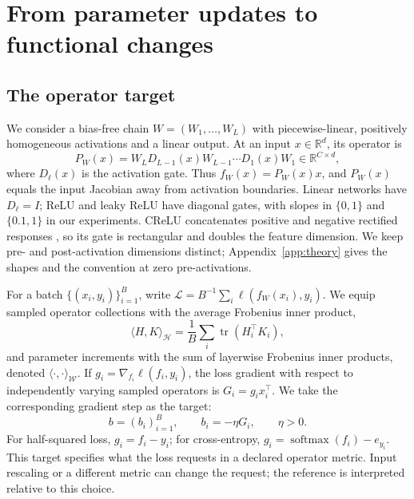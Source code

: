\documentclass{article}
\newcommand{\R}{\mathbb{R}}
\DeclareMathOperator{\tr}{tr}
\theoremstyle{definition}
\theoremstyle{remark}
\begin{document}
\section{From parameter updates to functional changes}
\label{sec:method}

\subsection{The operator target}

We consider a bias-free chain $W=(W_1,\ldots,W_L)$ with piecewise-linear, positively homogeneous activations and a linear output. At an input $x\in\R^d$, its operator is
\begin{equation}
 P_W(x)=W_LD_{L-1}(x)W_{L-1}\cdots D_1(x)W_1\in\R^{C\times d},
 \label{eq:operator}
\end{equation}
where $D_\ell(x)$ is the activation gate. Thus $f_W(x)=P_W(x)x$, and $P_W(x)$ equals the input Jacobian away from activation boundaries. Linear networks have $D_\ell=I$; ReLU and leaky ReLU have diagonal gates, with slopes in $\{0,1\}$ and $\{0.1,1\}$ in our experiments. CReLU concatenates positive and negative rectified responses \citep{shang2016crelu}, so its gate is rectangular and doubles the feature dimension. We keep pre- and post-activation dimensions distinct; Appendix~\ref{app:theory} gives the shapes and the convention at zero pre-activations.

For a batch $\{(x_i,y_i)\}_{i=1}^B$, write $\mathcal L=B^{-1}\sum_i\ell(f_W(x_i),y_i)$. We equip sampled operator collections with the average Frobenius inner product,
\begin{equation}
 \langle H,K\rangle_{\mathcal H}=\frac1B\sum_i\tr(H_i^\top K_i),
 \label{eq:metric}
\end{equation}
and parameter increments with the sum of layerwise Frobenius inner products, denoted $\langle\cdot,\cdot\rangle_{\mathcal W}$. If $g_i=\nabla_{f_i}\ell(f_i,y_i)$, the loss gradient with respect to independently varying sampled operators is $G_i=g_i x_i^\top$. We take the corresponding gradient step as the target:
\begin{equation}
 b=(b_i)_{i=1}^B,\qquad b_i=-\eta G_i,\qquad \eta>0.
 \label{eq:target}
\end{equation}
For half-squared loss, $g_i=f_i-y_i$; for cross-entropy, $g_i=\operatorname{softmax}(f_i)-e_{y_i}$. This target specifies what the loss requests in a declared operator metric. Input rescaling or a different metric can change the request; the reference is interpreted relative to this choice.
\end{document}
